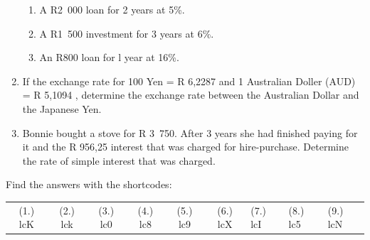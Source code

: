 \begin{enumerate}[noitemsep, label=\textbf{\arabic*}. ]
\label{m39335*id75796}\begin{enumerate}[noitemsep, label=\textbf{\alph*}. ] 
            \label{m39335*uid90}\item A R2~000 loan for 2 years at 5\%.
\label{m39335*uid91}\item A R1~500 investment for 3 years at 6\%.
\label{m39335*uid92}\item An R800 loan for l year at 16\%.
\end{enumerate}
\label{m39335*uid93}\item If the exchange rate for 100 Yen = R 6,2287 and 1 Australian Doller (AUD) = R 5,1094 , determine the exchange rate between the Australian Dollar and the Japanese Yen.\newline
\label{m39335*uid94}\item Bonnie bought a stove for R 3~750. After 3 years she had finished paying for it and the R 956,25 interest that was charged for hire-purchase. Determine the rate of simple interest that was charged.\newline
\end{enumerate}
  \label{m39335**end}
  \label{5925cb6120ab0c0f7c78bd2516b027ff**end}
\par {} Find the answers with the shortcodes:
 \par \begin{tabular}[h]{cccccc}
 (1.) lcK  &  (2.) lck  &  (3.) lc0  &  (4.) lc8  &  (5.) lc9  &  (6.) lcX  &  (7.) lcI  &  (8.) lc5  &  (9.) lcN  & \end{tabular}

